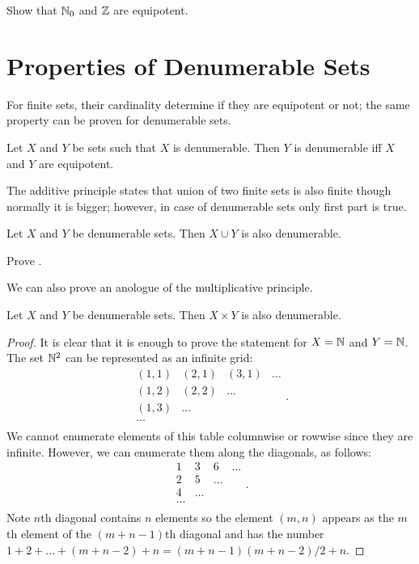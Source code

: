 \begin{exercise}
  Show that ${\mathbb{N}}_0$ and ${\mathbb{Z}}$ are equipotent.
\end{exercise}

\section{Properties of Denumerable Sets}

For finite sets, their cardinality determine if they are equipotent or not; the
same property can be proven for denumerable sets.
\begin{remark}
  Let $X$ and $Y$ be sets such that $X$ is denumerable. Then $Y$ is denumerable
  iff $X$ and $Y$ are equipotent.
\end{remark}

The additive principle states that union of two finite sets is also finite
though normally it is bigger; however, in case of denumerable sets only first
part is true.
\begin{theorem}
\label{theorem:union-denumerable-sets}
  Let $X$ and $Y$ be denumerable sets. Then $X \cup Y$ is also denumerable.
\end{theorem}

\begin{exercise}
  Prove .
\end{exercise}


We can also prove an anologue of the multiplicative principle.
\begin{theorem}
  Let $X$ and $Y$ be denumerable sets. Then $X \times Y$ is also denumerable.
\end{theorem}
\begin{proof}
  It is clear that it is enough to prove the statement for $X = {\mathbb{N}}$ and $Y =
  {\mathbb{N}}$. The set ${\mathbb{N}}^2$ can be represented as an infinite grid:
  \[
    \begin{matrix}
      (1, 1) & (2, 1) & (3, 1) & \dots \\
      (1, 2) & (2, 2) & \dots \\
      (1, 3) & \dots \\
      \dots \\
    \end{matrix}.
  \]
  We cannot enumerate elements of this table columnwise or rowwise since they
  are infinite. However, we can enumerate them along the diagonals, as follows:
  \[
    \begin{matrix}
      1 & 3 & 6 & \dots \\
      2 & 5 & \dots \\
      4 & \dots \\
      \dots \\
    \end{matrix}.
  \]
  Note $n$th diagonal contains $n$ elements so the element $(m, n)$ appears as
  the $m$th element of the $(m + n - 1)$th diagonal and has the number 
  $1 + 2 + \dots + (m + n - 2) + n = (m + n - 1) (m + n - 2) / 2 + n$.
\end{proof}

